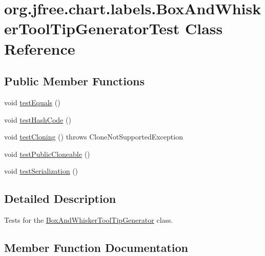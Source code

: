\hypertarget{classorg_1_1jfree_1_1chart_1_1labels_1_1_box_and_whisker_tool_tip_generator_test}{}\section{org.\+jfree.\+chart.\+labels.\+Box\+And\+Whisker\+Tool\+Tip\+Generator\+Test Class Reference}
\label{classorg_1_1jfree_1_1chart_1_1labels_1_1_box_and_whisker_tool_tip_generator_test}
\subsection*{Public Member Functions}
\begin{DoxyCompactItemize}
\item 
void \mbox{\hyperlink{classorg_1_1jfree_1_1chart_1_1labels_1_1_box_and_whisker_tool_tip_generator_test_a646688171d9fe1b4c5639bea5448dfa6}{test\+Equals}} ()
\item 
void \mbox{\hyperlink{classorg_1_1jfree_1_1chart_1_1labels_1_1_box_and_whisker_tool_tip_generator_test_ac3fbc69d262dd19ed7fc492e32abc240}{test\+Hash\+Code}} ()
\item 
void \mbox{\hyperlink{classorg_1_1jfree_1_1chart_1_1labels_1_1_box_and_whisker_tool_tip_generator_test_a4ed8d56fd129619a78d133d2d5603b0d}{test\+Cloning}} ()  throws Clone\+Not\+Supported\+Exception 
\item 
void \mbox{\hyperlink{classorg_1_1jfree_1_1chart_1_1labels_1_1_box_and_whisker_tool_tip_generator_test_a3b63ab7ceee1456023ad684700f7c0dd}{test\+Public\+Cloneable}} ()
\item 
void \mbox{\hyperlink{classorg_1_1jfree_1_1chart_1_1labels_1_1_box_and_whisker_tool_tip_generator_test_a50c2e4d539721899a710a592e0090873}{test\+Serialization}} ()
\end{DoxyCompactItemize}


\subsection{Detailed Description}
Tests for the \mbox{\hyperlink{classorg_1_1jfree_1_1chart_1_1labels_1_1_box_and_whisker_tool_tip_generator}{Box\+And\+Whisker\+Tool\+Tip\+Generator}} class. 

\subsection{Member Function Documentation}
\mbox{\label{classorg_1_1jfree_1_1chart_1_1labels_1_1_box_and_whisker_tool_tip_generator_test_a4ed8d56fd129619a78d133d2d5603b0d}} 
